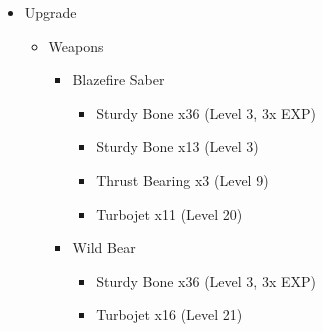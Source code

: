 \begin{upgrade}
\begin{itemize}
    \item Upgrade
    \begin{itemize}
        \item Weapons
        \begin{itemize}
            \item Blazefire Saber
            \begin{itemize}
                \item Sturdy Bone x36 (Level 3, 3x EXP)
                \item Sturdy Bone x13 (Level 3)
                \item Thrust Bearing x3 (Level 9)
                \item Turbojet x11 (Level 20)
            \end{itemize}
            \item Wild Bear
            \begin{itemize}
                \item Sturdy Bone x36 (Level 3, 3x EXP)
                \item Turbojet x16 (Level 21)
            \end{itemize}
        \end{itemize}
    \end{itemize}
\end{itemize}
\end{upgrade}
